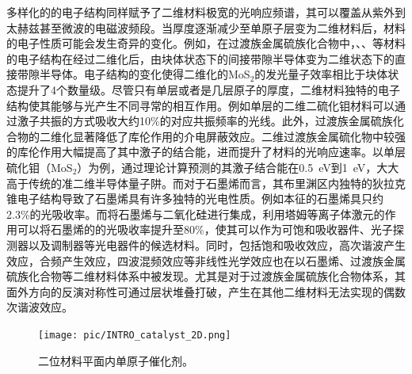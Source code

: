     多样化的的电子结构同样赋予了二维材料极宽的光响应频谱，其可以覆盖从紫外到太赫兹甚至微波的电磁波频段。当厚度逐渐减少至单原子层变为二维材料后，材料的电子性质可能会发生奇异的变化。例如，在过渡族金属硫族化合物中，、、等材料的电子结构在经过二维化后，由块体状态下的间接带隙半导体变为二维状态下的直接带隙半导体。电子结构的变化使得二维化的MoS$_2$的发光量子效率相比于块体状态提升了4个数量级。尽管只有单层或者是几层原子的厚度，二维材料独特的电子结构使其能够与光产生不同寻常的相互作用。例如单层的二维二硫化钼材料可以通过激子共振的方式吸收大约10\%的对应共振频率的光线。此外，过渡族金属硫族化合物的二维化显著降低了库伦作用的介电屏蔽效应。二维过渡族金属硫化物中较强的库伦作用大幅提高了其中激子的结合能，进而提升了材料的光响应速率。以单层硫化钼（MoS$_2$）为例，通过理论计算预测的其激子结合能在\SI{0.5}{\electronvolt}到\SI{1}{\electronvolt}，大大高于传统的准二维半导体量子阱。而对于石墨烯而言，其布里渊区内独特的狄拉克锥电子结构导致了石墨烯具有许多独特的光电性质。例如本征的石墨烯具只约2.3\%的光吸收率。而将石墨烯与二氧化硅进行集成，利用塔姆等离子体激元的作用可以将石墨烯的的光吸收率提升至80\%，使其可以作为可饱和吸收器件、光子探测器以及调制器等光电器件的候选材料。同时，包括饱和吸收效应，高次谐波产生效应，合频产生效应，四波混频效应等非线性光学效应也在以石墨烯、过渡族金属硫族化合物等二维材料体系中被发现。尤其是对于过渡族金属硫族化合物体系，其面外方向的反演对称性可通过层状堆叠打破，产生在其他二维材料无法实现的偶数次谐波效应。
    
    \begin{figure}[htb]
        \texttt{[image: pic/INTRO\_catalyst\_2D.png]}
        \caption{二位材料平面内单原子催化剂。}
        \label{}
    \end{figure}

